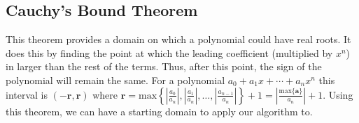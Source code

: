 \documentclass[]{article}
\theoremstyle{definition}
\begin{document}
\subsection{Cauchy's Bound Theorem}
This theorem provides a domain on which a polynomial could have real roots. It does this by finding the point at which the leading coefficient (multiplied by $x^n$) in larger than the rest of the terms. Thus, after this point, the sign of the polynomial will remain the same. For a polynomial $a_0 + a_1x + \cdots + a_nx^n$ this interval is $(-\textbf{r}, \textbf{r})$ where $\textbf{r} = \textrm{max} \left\{ \left| \frac{a_0}{a_n}\right| , \left| \frac{a_1}{a_n}\right| , \ldots, \left| \frac{a_{n-1}}{a_n}\right| \right\} + 1 = \left| \frac{\textrm{max} \{\textbf{a}\}}{a_n} \right| + 1$. Using this theorem, we can have a starting domain to apply our algorithm to.
\end{document}
